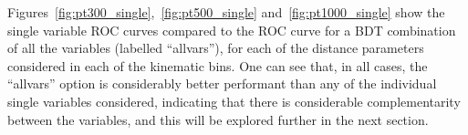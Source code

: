 Figures~\ref{fig:pt300_single},~\ref{fig:pt500_single}
and~\ref{fig:pt1000_single} show the single variable ROC curves
compared to the ROC curve for a BDT combination of all the variables
(labelled ``allvars''),
for each of the \antikt distance parameters considered in each of the
kinematic bins. One can see that, in all cases, the ``allvars'' option
is considerably better performant than any of the individual single variables
considered, indicating that there is considerable complementarity
between the variables, and this will be explored further in the next
section. 






%

